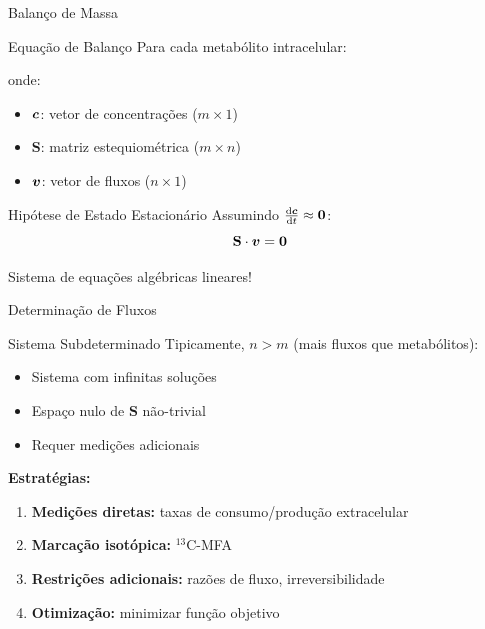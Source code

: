 \begin{frame}{Balanço de Massa}
\begin{block}{Equação de Balanço}
Para cada metabólito intracelular:

onde:
\begin{itemize}
    \item $\boldsymbol{c}$: vetor de concentrações ($m \times 1$)
    \item $\mathbf{S}$: matriz estequiométrica ($m \times n$)
    \item $\boldsymbol{v}$: vetor de fluxos ($n \times 1$)
\end{itemize}
\end{block}

\begin{block}{Hipótese de Estado Estacionário}
Assumindo $\frac{\mathrm{d} \boldsymbol{c}}{\mathrm{d} t} \approx \boldsymbol{0}$:
\begin{equation*}
\mathbf{S} \cdot \boldsymbol{v} = \boldsymbol{0}
\end{equation*}

Sistema de equações algébricas lineares!
\end{block}
\end{frame}

\begin{frame}{Determinação de Fluxos}
\begin{block}{Sistema Subdeterminado}
Tipicamente, $n > m$ (mais fluxos que metabólitos):
\begin{itemize}
    \item Sistema com infinitas soluções
    \item Espaço nulo de $\mathbf{S}$ não-trivial
    \item Requer medições adicionais
\end{itemize}
\end{block}

\vspace{0.3cm}

\textbf{Estratégias:}
\begin{enumerate}
    \item \textbf{Medições diretas:} taxas de consumo/produção extracelular
    \item \textbf{Marcação isotópica:} $^{13}$C-MFA
    \item \textbf{Restrições adicionais:} razões de fluxo, irreversibilidade
    \item \textbf{Otimização:} minimizar função objetivo
\end{enumerate}

\end{frame}

